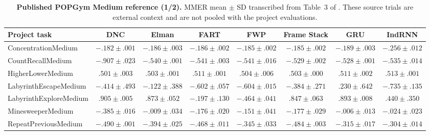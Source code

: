 \begin{table}[p]
\centering\scriptsize
\setlength{\tabcolsep}{2.7pt}
\renewcommand{\arraystretch}{1.08}
\caption{\textbf{Published POPGym Medium reference (1/2).} MMER mean $\pm$ SD transcribed from Table~3 of \citet{morad2023popgym}. These source trials are external context and are not pooled with the project evaluations.}
\label{table:popgym_published_medium_1}
\begin{tabular}{@{}p{}ccccccc@{}}
\toprule
Project task & DNC & Elman & FART & FWP & Frame Stack & GRU & IndRNN \\
\midrule
ConcentrationMedium & $-.182\pm.001$ & $-.186\pm.003$ & $-.186\pm.002$ & $-.185\pm.002$ & $-.185\pm.002$ & $-.189\pm.003$ & $-.256\pm.012$ \\
CountRecallMedium & $-.907\pm.023$ & $-.540\pm.001$ & $-.541\pm.003$ & $-.541\pm.016$ & $-.529\pm.002$ & $-.528\pm.001$ & $-.535\pm.014$ \\
HigherLowerMedium & $.501\pm.003$ & $.503\pm.001$ & $.511\pm.001$ & $.504\pm.006$ & $.503\pm.000$ & $.511\pm.002$ & $.513\pm.001$ \\
LabyrinthEscapeMedium & $-.414\pm.493$ & $-.122\pm.388$ & $-.602\pm.057$ & $-.604\pm.015$ & $-.384\pm.271$ & $.230\pm.642$ & $-.735\pm.135$ \\
LabyrinthExploreMedium & $.905\pm.005$ & $.873\pm.052$ & $-.197\pm.130$ & $-.464\pm.041$ & $.847\pm.063$ & $.893\pm.008$ & $.440\pm.350$ \\
MinesweeperMedium & $-.385\pm.016$ & $-.009\pm.034$ & $-.176\pm.020$ & $-.151\pm.041$ & $-.177\pm.029$ & $-.006\pm.013$ & $-.024\pm.023$ \\
RepeatPreviousMedium & $-.490\pm.001$ & $-.394\pm.025$ & $-.468\pm.011$ & $-.345\pm.033$ & $-.484\pm.003$ & $-.315\pm.017$ & $-.304\pm.014$ \\
\bottomrule
\end{tabular}
\end{table}
